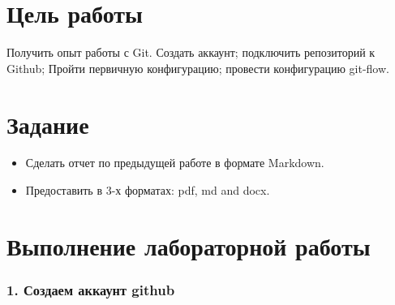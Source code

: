 \hypertarget{ux446ux435ux43bux44c-ux440ux430ux431ux43eux442ux44b}{%
\section{Цель
работы}\label{ux446ux435ux43bux44c-ux440ux430ux431ux43eux442ux44b}}

Получить опыт работы с Git. Создать аккаунт; подключить репозиторий к
Github; Пройти первичную конфигурацию; провести конфигурацию git-flow.

\hypertarget{ux437ux430ux434ux430ux43dux438ux435}{%
\section{Задание}\label{ux437ux430ux434ux430ux43dux438ux435}}

\begin{itemize}
\item
  Сделать отчет по предыдущей работе в формате Markdown.
\item
  Предоставить в 3-х форматах: pdf, md and docx.
\end{itemize}

\hypertarget{ux432ux44bux43fux43eux43bux43dux435ux43dux438ux435-ux43bux430ux431ux43eux440ux430ux442ux43eux440ux43dux43eux439-ux440ux430ux431ux43eux442ux44b}{%
\section{Выполнение лабораторной
работы}\label{ux432ux44bux43fux43eux43bux43dux435ux43dux438ux435-ux43bux430ux431ux43eux440ux430ux442ux43eux440ux43dux43eux439-ux440ux430ux431ux43eux442ux44b}}

\hypertarget{ux441ux43eux437ux434ux430ux435ux43c-ux430ux43aux43aux430ux443ux43dux442-github}{%
\subsubsection{1. Создаем аккаунт
github}\label{ux441ux43eux437ux434ux430ux435ux43c-ux430ux43aux43aux430ux443ux43dux442-github}}

